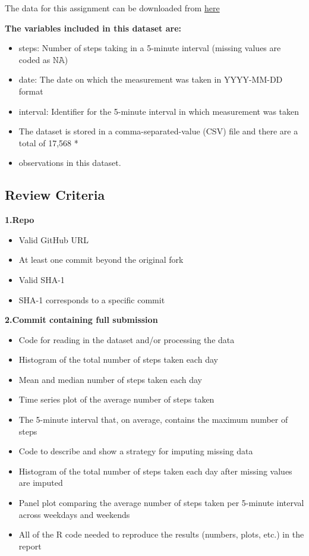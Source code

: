\documentclass[
]{article}
\begin{document}
The data for this assignment can be downloaded from
\href{https://d396qusza40orc.cloudfront.net/repdata\%2Fdata\%2Factivity.zip}{here}

\textbf{The variables included in this dataset are:}

\begin{itemize}
\item
  steps: Number of steps taking in a 5-minute interval (missing values
  are coded as 𝙽𝙰)
\item
  date: The date on which the measurement was taken in YYYY-MM-DD format
\item
  interval: Identifier for the 5-minute interval in which measurement
  was taken
\item
  The dataset is stored in a comma-separated-value (CSV) file and there
  are a total of 17,568 *
\item
  observations in this dataset.
\end{itemize}

\hypertarget{review-criteria}{%
\subsection{Review Criteria}\label{review-criteria}}

\textbf{1.Repo}

\begin{itemize}
\item
  Valid GitHub URL
\item
  At least one commit beyond the original fork
\item
  Valid SHA-1
\item
  SHA-1 corresponds to a specific commit
\end{itemize}

\textbf{2.Commit containing full submission}

\begin{itemize}
\item
  Code for reading in the dataset and/or processing the data
\item
  Histogram of the total number of steps taken each day
\item
  Mean and median number of steps taken each day
\item
  Time series plot of the average number of steps taken
\item
  The 5-minute interval that, on average, contains the maximum number of
  steps
\item
  Code to describe and show a strategy for imputing missing data
\item
  Histogram of the total number of steps taken each day after missing
  values are imputed
\item
  Panel plot comparing the average number of steps taken per 5-minute
  interval across weekdays and weekends
\item
  All of the R code needed to reproduce the results (numbers, plots,
  etc.) in the report
\end{itemize}
\end{document}
